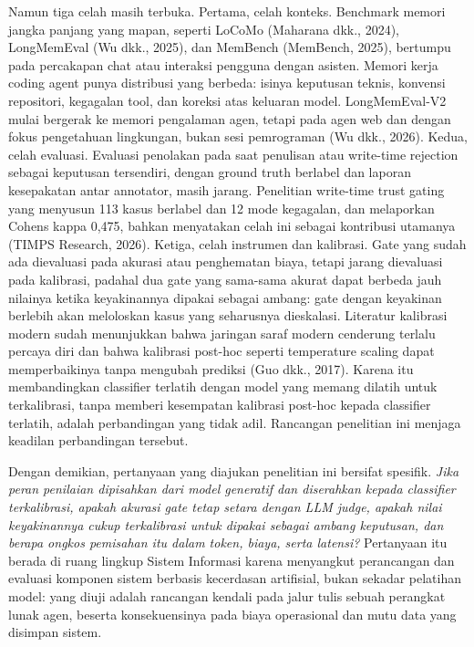\documentclass[
]{article}
\begin{document}
Namun tiga celah masih terbuka. Pertama, celah konteks. Benchmark memori
jangka panjang yang mapan, seperti LoCoMo (Maharana dkk., 2024),
LongMemEval (Wu dkk., 2025), dan MemBench (MemBench, 2025), bertumpu
pada percakapan chat atau interaksi pengguna dengan asisten. Memori
kerja coding agent punya distribusi yang berbeda: isinya keputusan
teknis, konvensi repositori, kegagalan tool, dan koreksi atas keluaran
model. LongMemEval-V2 mulai bergerak ke memori pengalaman agen, tetapi
pada agen web dan dengan fokus pengetahuan lingkungan, bukan sesi
pemrograman (Wu dkk., 2026). Kedua, celah evaluasi. Evaluasi penolakan
pada saat penulisan atau write-time rejection sebagai keputusan
tersendiri, dengan ground truth berlabel dan laporan kesepakatan antar
annotator, masih jarang. Penelitian write-time trust gating yang
menyusun 113 kasus berlabel dan 12 mode kegagalan, dan melaporkan
Cohen\textquotesingle s kappa 0,475, bahkan menyatakan celah ini sebagai
kontribusi utamanya (TIMPS Research, 2026). Ketiga, celah instrumen dan
kalibrasi. Gate yang sudah ada dievaluasi pada akurasi atau penghematan
biaya, tetapi jarang dievaluasi pada kalibrasi, padahal dua gate yang
sama-sama akurat dapat berbeda jauh nilainya ketika keyakinannya dipakai
sebagai ambang: gate dengan keyakinan berlebih akan meloloskan kasus
yang seharusnya dieskalasi. Literatur kalibrasi modern sudah menunjukkan
bahwa jaringan saraf modern cenderung terlalu percaya diri dan bahwa
kalibrasi post-hoc seperti temperature scaling dapat memperbaikinya
tanpa mengubah prediksi (Guo dkk., 2017). Karena itu membandingkan
classifier terlatih dengan model yang memang dilatih untuk terkalibrasi,
tanpa memberi kesempatan kalibrasi post-hoc kepada classifier terlatih,
adalah perbandingan yang tidak adil. Rancangan penelitian ini menjaga
keadilan perbandingan tersebut.

Dengan demikian, pertanyaan yang diajukan penelitian ini bersifat
spesifik. \emph{Jika peran penilaian dipisahkan dari model generatif dan
diserahkan kepada classifier terkalibrasi, apakah akurasi gate tetap
setara dengan LLM judge, apakah nilai keyakinannya cukup terkalibrasi
untuk dipakai sebagai ambang keputusan, dan berapa ongkos pemisahan itu
dalam token, biaya, serta latensi?} Pertanyaan itu berada di ruang
lingkup Sistem Informasi karena menyangkut perancangan dan evaluasi
komponen sistem berbasis kecerdasan artifisial, bukan sekadar pelatihan
model: yang diuji adalah rancangan kendali pada jalur tulis sebuah
perangkat lunak agen, beserta konsekuensinya pada biaya operasional dan
mutu data yang disimpan sistem.
\end{document}
